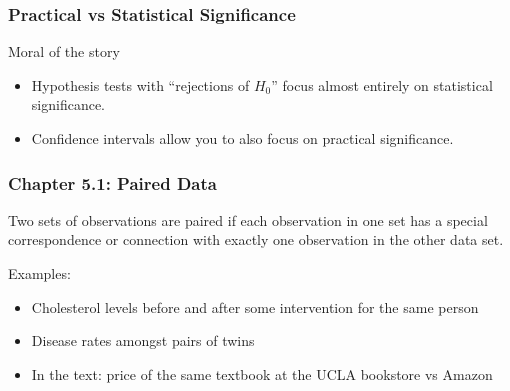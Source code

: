 \documentclass[handout]{beamer}
\newcommand{\blue}[1]{\textcolor{blue2}{#1}}
\begin{document}
\begin{frame}
\frametitle{Practical vs Statistical Significance}

Moral of the story

\begin{itemize}
\pause\item Hypothesis tests with ``rejections of $H_0$'' focus almost entirely on \blue{statistical significance}.
\pause\item Confidence intervals allow you to also focus on \blue{practical significance}.  
\end{itemize}

\end{frame}


\begin{frame}[fragile]
\frametitle{Chapter 5.1: Paired Data}
Two sets of observations are \blue{paired} if each observation in one set has a special correspondence or connection with exactly one observation in the other data set.

\vspace{0.25cm} 

\pause Examples:

\begin{itemize}
\item Cholesterol levels before and after some intervention for the same person
\pause \item Disease rates amongst pairs of twins
\pause \item In the text:  price of the same textbook at the UCLA bookstore vs Amazon
\end{itemize}

\end{frame}
\end{document}
